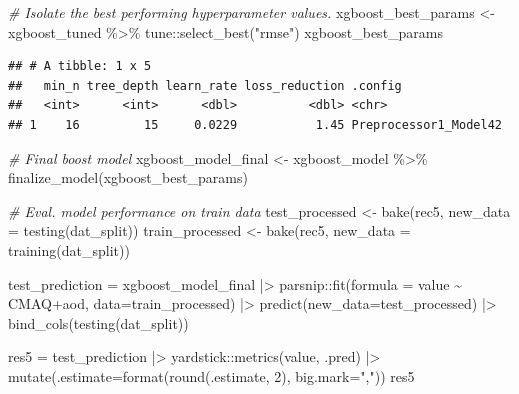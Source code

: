 \documentclass[
]{article}
\newenvironment{Shaded}{\begin{snugshade}}{\end{snugshade}}
\newcommand{\AttributeTok}[1]{\textcolor[rgb]{0.77,0.63,0.00}{#1}}
\newcommand{\CommentTok}[1]{\textcolor[rgb]{0.56,0.35,0.01}{\textit{#1}}}
\newcommand{\DecValTok}[1]{\textcolor[rgb]{0.00,0.00,0.81}{#1}}
\newcommand{\FunctionTok}[1]{\textcolor[rgb]{0.00,0.00,0.00}{#1}}
\newcommand{\NormalTok}[1]{#1}
\newcommand{\OtherTok}[1]{\textcolor[rgb]{0.56,0.35,0.01}{#1}}
\newcommand{\SpecialCharTok}[1]{\textcolor[rgb]{0.00,0.00,0.00}{#1}}
\newcommand{\StringTok}[1]{\textcolor[rgb]{0.31,0.60,0.02}{#1}}
\begin{document}
\begin{Shaded}
\begin{Highlighting}[]
\CommentTok{\# Isolate the best performing hyperparameter values.}
\NormalTok{xgboost\_best\_params }\OtherTok{\textless{}{-}}\NormalTok{ xgboost\_tuned }\SpecialCharTok{\%\textgreater{}\%}\NormalTok{ tune}\SpecialCharTok{::}\FunctionTok{select\_best}\NormalTok{(}\StringTok{"rmse"}\NormalTok{)}
\NormalTok{xgboost\_best\_params}
\end{Highlighting}
\end{Shaded}

\begin{verbatim}
## # A tibble: 1 x 5
##   min_n tree_depth learn_rate loss_reduction .config              
##   <int>      <int>      <dbl>          <dbl> <chr>                
## 1    16         15     0.0229           1.45 Preprocessor1_Model42
\end{verbatim}

\begin{Shaded}
\begin{Highlighting}[]
\CommentTok{\# Final boost model}
\NormalTok{xgboost\_model\_final }\OtherTok{\textless{}{-}}\NormalTok{ xgboost\_model }\SpecialCharTok{\%\textgreater{}\%} \FunctionTok{finalize\_model}\NormalTok{(xgboost\_best\_params)}

\CommentTok{\# Eval. model performance on train data}
\NormalTok{test\_processed }\OtherTok{\textless{}{-}} \FunctionTok{bake}\NormalTok{(rec5,  }\AttributeTok{new\_data =} \FunctionTok{testing}\NormalTok{(dat\_split))}
\NormalTok{train\_processed }\OtherTok{\textless{}{-}} \FunctionTok{bake}\NormalTok{(rec5,  }\AttributeTok{new\_data =} \FunctionTok{training}\NormalTok{(dat\_split))}

\NormalTok{test\_prediction }\OtherTok{=}\NormalTok{ xgboost\_model\_final }\SpecialCharTok{|\textgreater{}} 
\NormalTok{  parsnip}\SpecialCharTok{::}\FunctionTok{fit}\NormalTok{(}\AttributeTok{formula =}\NormalTok{ value }\SpecialCharTok{\textasciitilde{}}\NormalTok{ CMAQ}\SpecialCharTok{+}\NormalTok{aod, }\AttributeTok{data=}\NormalTok{train\_processed) }\SpecialCharTok{|\textgreater{}} 
  \FunctionTok{predict}\NormalTok{(}\AttributeTok{new\_data=}\NormalTok{test\_processed) }\SpecialCharTok{|\textgreater{}} 
  \FunctionTok{bind\_cols}\NormalTok{(}\FunctionTok{testing}\NormalTok{(dat\_split))}

\NormalTok{res5 }\OtherTok{=}\NormalTok{ test\_prediction }\SpecialCharTok{|\textgreater{}} 
\NormalTok{  yardstick}\SpecialCharTok{::}\FunctionTok{metrics}\NormalTok{(value, .pred) }\SpecialCharTok{|\textgreater{}} 
  \FunctionTok{mutate}\NormalTok{(}\AttributeTok{.estimate=}\FunctionTok{format}\NormalTok{(}\FunctionTok{round}\NormalTok{(.estimate, }\DecValTok{2}\NormalTok{), }\AttributeTok{big.mark=}\StringTok{","}\NormalTok{))}
\NormalTok{res5}
\end{Highlighting}
\end{Shaded}
\end{document}
